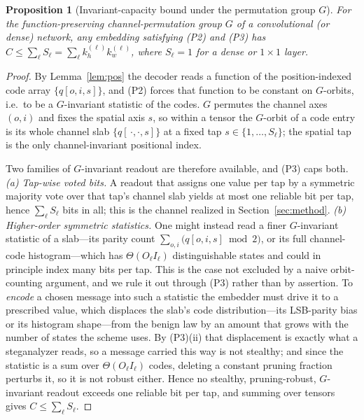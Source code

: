 \documentclass[a4paper,fleqn]{cas-dc}
\theoremstyle{plain}
\newtheorem{proposition}{Proposition}
\theoremstyle{remark}
\begin{document}
\begin{proposition}[Invariant-capacity bound under the permutation group $G$]\label{prop:bound}
For the function-preserving channel-permutation group $G$ of a convolutional (or dense)
network, any embedding satisfying \textup{(P2)} and \textup{(P3)} has
$C\le\sum_{\ell} S_\ell=\sum_\ell k_h^{(\ell)}k_w^{(\ell)}$, where $S_\ell=1$ for a dense or
$1\times1$ layer.
\end{proposition}
\begin{proof}
By Lemma~\ref{lem:pos} the decoder reads a function of the position-indexed code array
$\{q[o,i,s]\}$, and (P2) forces that function to be constant on $G$-orbits, i.e.\ to be a
$G$-invariant statistic of the codes. $G$ permutes the channel axes $(o,i)$ and fixes the
spatial axis $s$, so within a tensor the $G$-orbit of a code entry is its whole channel slab
$\{q[\,\cdot,\cdot,s]\}$ at a fixed tap $s\in\{1,\dots,S_\ell\}$; the spatial tap is the only
channel-invariant positional index.

Two families of $G$-invariant readout are therefore available, and \textup{(P3)} caps both.
\emph{(a) Tap-wise voted bits.} A readout that assigns one value per tap by a symmetric
majority vote over that tap's channel slab yields at most one reliable bit per tap, hence
$\sum_\ell S_\ell$ bits in all; this is the channel realized in Section~\ref{sec:method}.
\emph{(b) Higher-order symmetric statistics.} One might instead read a finer $G$-invariant
statistic of a slab---its parity count $\sum_{o,i}\!\big(q[o,i,s]\bmod 2\big)$, or its full
channel-code histogram---which has $\Theta(O_\ell I_\ell)$ distinguishable states and could in
principle index many bits per tap. This is the case not excluded by a naive orbit-counting
argument, and we rule it out through \textup{(P3)} rather than by assertion. To \emph{encode} a
chosen message into such a statistic the embedder must drive it to a prescribed value, which
displaces the slab's code distribution---its LSB-parity bias or its histogram shape---from the
benign law by an amount that grows with the number of states the scheme uses. By
\textup{(P3)(ii)} that displacement is exactly what a steganalyzer reads, so a message carried
this way is not stealthy; and since the statistic is a sum over $\Theta(O_\ell I_\ell)$ codes,
deleting a constant pruning fraction perturbs it, so it is not robust either. Hence no stealthy,
pruning-robust, $G$-invariant readout exceeds one reliable bit per tap, and summing over tensors
gives $C\le\sum_\ell S_\ell$.
\end{proof}
\end{document}
